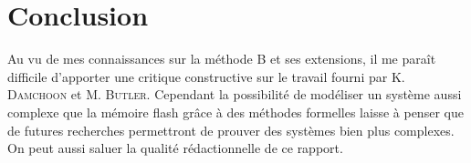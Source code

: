 \documentclass[12pt,a4paper,utf8x]{article}
\begin{document}
\section{Conclusion}
Au vu de mes connaissances sur la méthode B et ses extensions, il me paraît difficile d'apporter une critique constructive sur le travail fourni par K. \textsc{Damchoon} et M. \textsc{Butler}. Cependant la possibilité de modéliser un système aussi complexe que la mémoire flash grâce à des méthodes formelles laisse à penser que de futures recherches permettront de prouver des systèmes bien plus complexes. On peut aussi saluer la qualité rédactionnelle de ce rapport.




% 
%
% 
% 
% 


% 
% 
% 
\end{document}

